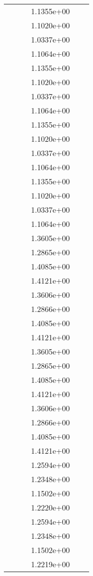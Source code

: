 \begin{xltabular}{\textwidth}{r|rS[table-format=1.3e+2]S[table-format=1.4e+2]S[table-format=1.4e+2]S[table-format=-1.5]}
&  &  & 1.1355e+00 & & \\
&  &  & 1.1020e+00 & & \\
&  &  & 1.0337e+00 & & \\
&  &  & 1.1064e+00 & & \\
&  &  & 1.1355e+00 & & \\
&  &  & 1.1020e+00 & & \\
&  &  & 1.0337e+00 & & \\
&  &  & 1.1064e+00 & & \\
&  &  & 1.1355e+00 & & \\
&  &  & 1.1020e+00 & & \\
&  &  & 1.0337e+00 & & \\
&  &  & 1.1064e+00 & & \\
&  &  & 1.1355e+00 & & \\
&  &  & 1.1020e+00 & & \\
&  &  & 1.0337e+00 & & \\
&  &  & 1.1064e+00 & & \\
&  &  & 1.3605e+00 & & \\
&  &  & 1.2865e+00 & & \\
&  &  & 1.4085e+00 & & \\
&  &  & 1.4121e+00 & & \\
&  &  & 1.3606e+00 & & \\
&  &  & 1.2866e+00 & & \\
&  &  & 1.4085e+00 & & \\
&  &  & 1.4121e+00 & & \\
&  &  & 1.3605e+00 & & \\
&  &  & 1.2865e+00 & & \\
&  &  & 1.4085e+00 & & \\
&  &  & 1.4121e+00 & & \\
&  &  & 1.3606e+00 & & \\
&  &  & 1.2866e+00 & & \\
&  &  & 1.4085e+00 & & \\
&  &  & 1.4121e+00 & & \\
&  &  & 1.2594e+00 & & \\
&  &  & 1.2348e+00 & & \\
&  &  & 1.1502e+00 & & \\
&  &  & 1.2220e+00 & & \\
&  &  & 1.2594e+00 & & \\
&  &  & 1.2348e+00 & & \\
&  &  & 1.1502e+00 & & \\
&  &  & 1.2219e+00 & & \\

\end{xltabular}
